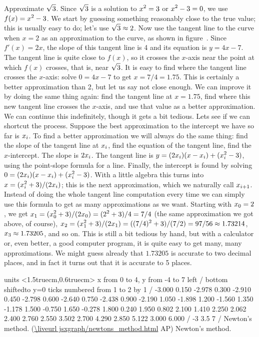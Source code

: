 \example Approximate $\displaystyle \sqrt{3}$. Since $\displaystyle \sqrt{3}$ is a solution to
$\displaystyle x^2=3$ or $\displaystyle x^2-3=0$, we use $\displaystyle f(x)=x^2-3$. We start by guessing
something reasonably close to the true value; this is usually easy to
do; let's use $\displaystyle \sqrt3\approx2$. Now use the tangent line to the curve
when $x=2$ as an approximation to the curve, as shown in
figure~. Since $f'(x)=2x$, the slope of this
tangent line is 4 and its equation is $y=4x-7$. The tangent line is
quite close to $f(x)$, so it crosses the $x$-axis near the point at
which $f(x)$ crosses, that is, near $\displaystyle \sqrt3$. It is easy to find where
the tangent line crosses the $x$-axis: solve $0=4x-7$ to get
$x=7/4=1.75$. This is certainly a better approximation than 2, but let
us say not close enough. We can improve it by doing the same thing
again: find the tangent line at $x=1.75$, find where this new tangent
line crosses the $x$-axis, and use that value as a better
approximation. We can continue this indefinitely, though it gets a bit
tedious. Lets see if we can shortcut the process. Suppose the best
approximation to the intercept we have so far is $\displaystyle x_i$. To find a
better approximation we will always
do the same thing: find the slope of the tangent line at $\displaystyle x_i$, find the
equation of the tangent line, find the $x$-intercept. The slope is
$\displaystyle 2x_i$. The tangent line is $\displaystyle y=(2x_i)(x-x_i)+(x_i^2-3)$, using
the point-slope formula for a line. Finally, the intercept is found by
solving $\displaystyle 0 =(2x_i)(x-x_i)+(x_i^2-3)$. With a little algebra this turns
into $\displaystyle x=(x_i^2+3)/(2x_i)$; this is the next approximation, which we
naturally call $\displaystyle x_{i+1}$. Instead of doing the whole tangent line
computation every time we can simply use this formula to get as many
approximations as we want. Starting with $\displaystyle x_0=2$, we get
$\displaystyle x_1=(x_0^2+3)/(2x_0)=(2^2+3)/4=7/4$ (the same approximation we got
above, of course), $\displaystyle x_2=(x_1^2+3)/(2x_1)=
((7/4)^2+3)/(7/2)=97/56\approx 1.73214$, $\displaystyle x_3\approx 1.73205$, and so
on. This is still a bit tedious by hand, but with a calculator or,
even better, a good computer program, it is quite easy to get many,
many approximations. We might guess already that $1.73205$ is accurate
to two decimal places, and in fact it turns out that it is accurate to
5 places.  \endexample

\figure
\texonly
\vbox{\beginpicture
\normalgraphs
\sevenpoint
\setcoordinatesystem units <1.5truecm,0.6truecm>
\setplotarea x from 0 to 4, y from -4 to 7
\axis left /
\axis bottom shiftedto y=0 ticks numbered from 1 to 2 by 1 /
 -3.000 0.150 -2.978 0.300 -2.910 0.450 -2.798 0.600 -2.640 
0.750 -2.438 0.900 -2.190 1.050 -1.898 1.200 -1.560 1.350 -1.178 
1.500 -0.750 1.650 -0.278 1.800 0.240 1.950 0.802 2.100 1.410 
2.250 2.062 2.400 2.760 2.550 3.502 2.700 4.290 2.850 5.122 
3.000 6.000 /
\setlinear
{} -3 3.5 7 /
\endpicture}
\begincaption
Newton's method.
(\expandafter\url\expandafter{\liveurl jsxgraph/newtons_method.html}%
AP\endurl)
\endcaption
\endtexonly
{}
\htmlonly
\begincaption
Newton's method.
\endcaption
\endhtmlonly
\endfigure

